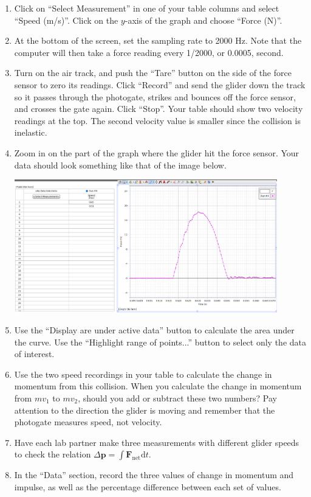 \begin{enumerate}[label=\arabic*.]
\item Click on ``Select Measurement'' in one of your table columns and select ``Speed (m/s)''.  Click on the \(y\)-axis of the graph and choose ``Force (N)''.

\item At the bottom of the screen, set the sampling rate to 2000 Hz.  Note that the computer will then take a force reading every 1/2000, or 0.0005, second.

\item Turn on the air track, and push the ``Tare'' button on the side of the force sensor to zero its readings.  Click ``Record'' and send the glider down the track so it passes through the photogate, strikes and bounces off the force sensor, and crosses the gate again.  Click ``Stop''.  Your table should show two velocity readings at the top.  The second velocity value is smaller since the collision is inelastic.

\item Zoom in on the part of the graph where the glider hit the force sensor.  Your data should look something like that of the image below.


\begin{center}
\includegraphics*[width=0.9\textwidth]{imgs/6labs/6Alab/6Aexp5/impulse.png}\label{fig:impulse-curve}\end{center}

\item Use the ``Display are under active data'' button to calculate the area under the curve.  Use the ``Highlight range of points...'' button to select only the data of interest.

\item Use the two speed recordings in your table to calculate the change in momentum from this collision.  When you calculate the change in momentum from \(mv_1\) to \(mv_2\), should you add or subtract these two numbers?  Pay attention to the direction the glider is moving and remember that the photogate measures speed, not velocity.

\item Have each lab partner make three measurements with different glider speeds to check the relation \(\Delta\textbf{p} = \int \textbf{F}_{\textrm{net}} \textrm{d}t\).  


\item In the ``Data'' section, record the three values of change in momentum and impulse, as well as the percentage difference between each set of values.

\end{enumerate}

